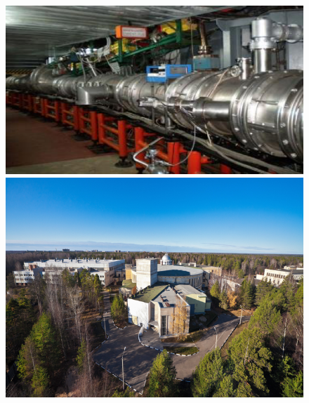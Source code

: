 \documentclass[dvipsnames] {beamer}
\begin{document}
\begin{frame}
\begin{columns}[t]
    \begin{block}{}
      \begin{figure}[H]
        \includegraphics[width=1.\linewidth]{nuclotron1.png} \\
        \includegraphics[width=1.\linewidth]{nuclotron2.png}
      \end{figure}
    \end{block}
  \end{columns}
\end{frame}
\end{document}

